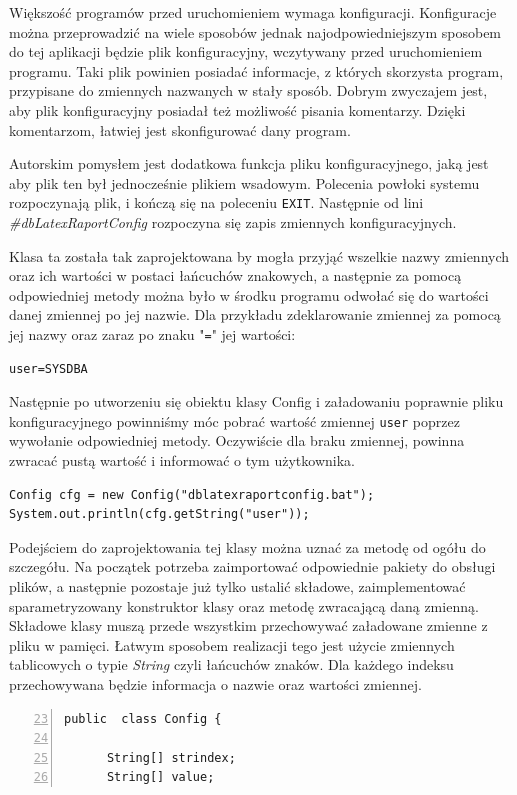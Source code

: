 Większość programów przed uruchomieniem wymaga konfiguracji. Konfiguracje można przeprowadzić na wiele sposobów jednak najodpowiedniejszym sposobem do tej aplikacji będzie plik konfiguracyjny, wczytywany przed uruchomieniem programu. Taki plik powinien posiadać informacje, z których skorzysta program, przypisane do zmiennych nazwanych w stały sposób.  Dobrym zwyczajem jest, aby plik konfiguracyjny posiadał też możliwość pisania komentarzy. Dzięki komentarzom, łatwiej jest skonfigurować dany program.
\par
Autorskim pomysłem jest dodatkowa funkcja pliku konfiguracyjnego, jaką jest aby plik ten był jednocześnie plikiem wsadowym. Polecenia powłoki systemu rozpoczynają plik, i kończą się na poleceniu \texttt{EXIT}. Następnie od lini \emph{\#dbLatexRaportConfig} rozpoczyna się zapis zmiennych konfiguracyjnych.
\par
Klasa ta została tak zaprojektowana by mogła przyjąć wszelkie nazwy zmiennych oraz ich wartości w postaci łańcuchów znakowych, a następnie za pomocą odpowiedniej metody można było w środku programu odwołać się do wartości danej zmiennej po jej nazwie. Dla przykładu zdeklarowanie zmiennej za pomocą jej nazwy oraz zaraz po znaku "\texttt{=}"  jej wartości:
\begin{lstlisting}
user=SYSDBA
\end{lstlisting}
Następnie po utworzeniu się obiektu klasy Config i załadowaniu poprawnie pliku konfiguracyjnego powinniśmy móc pobrać wartość  zmiennej \texttt{user} poprzez wywołanie odpowiedniej metody. Oczywiście dla braku zmiennej, powinna zwracać pustą wartość i informować o tym użytkownika.
\begin{lstlisting}
Config cfg = new Config("dblatexraportconfig.bat");
System.out.println(cfg.getString("user"));
\end{lstlisting}

Podejściem do zaprojektowania tej klasy można uznać za metodę od ogółu do szczegółu. Na początek potrzeba zaimportować odpowiednie pakiety do obsługi plików, a następnie pozostaje już tylko ustalić składowe, zaimplementować sparametryzowany konstruktor klasy oraz metodę zwracającą daną zmienną. Składowe klasy muszą przede wszystkim przechowywać załadowane zmienne z pliku w pamięci. Łatwym sposobem realizacji tego jest użycie zmiennych tablicowych o typie \emph{String} czyli łańcuchów znaków. Dla każdego indeksu przechowywana będzie informacja o nazwie oraz wartości zmiennej. 
\begin{lstlisting}[numbers=left,firstnumber=23]
public  class Config {

      String[] strindex;
      String[] value; 
\end{lstlisting}

